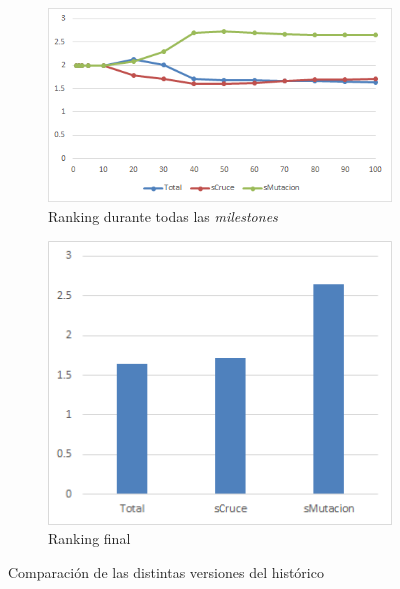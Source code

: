 \begin{figure}
     \centering
     \begin{subfigure}[b]{0.45\textwidth}
         \centering
         \includegraphics[width=\textwidth]{imagenes/Experimental/Historico.png}
         \caption{Ranking durante todas las \textit{milestones}}
         \label{fig:Historico_lineas}
     \end{subfigure}
     \hfill
     \begin{subfigure}[b]{0.45\textwidth}
         \centering
         \includegraphics[width=\textwidth]{imagenes/Experimental/barras/Historico.png}
         \caption{Ranking final}
         \label{fig:Historico_barras}
     \end{subfigure}
        \caption{Comparación de las distintas versiones del histórico}
        \label{fig:Historico}
\end{figure}


